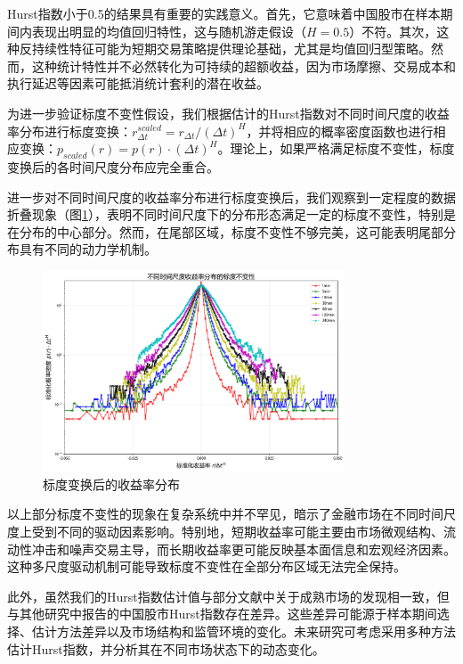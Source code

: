 \documentclass[12pt, a4paper]{article}
\begin{document}
Hurst指数小于0.5的结果具有重要的实践意义。首先，它意味着中国股市在样本期间内表现出明显的均值回归特性，这与随机游走假设（$H = 0.5$）不符。其次，这种反持续性特征可能为短期交易策略提供理论基础，尤其是均值回归型策略。然而，这种统计特性并不必然转化为可持续的超额收益，因为市场摩擦、交易成本和执行延迟等因素可能抵消统计套利的潜在收益。

为进一步验证标度不变性假设，我们根据估计的Hurst指数对不同时间尺度的收益率分布进行标度变换：$r_{\Delta t}^{scaled} = r_{\Delta t}/(\Delta t)^H$，并将相应的概率密度函数也进行相应变换：$p_{scaled}(r) = p(r) \cdot (\Delta t)^H$。理论上，如果严格满足标度不变性，标度变换后的各时间尺度分布应完全重合。

进一步对不同时间尺度的收益率分布进行标度变换后，我们观察到一定程度的数据折叠现象（图\ref{fig:normalized_distributions}），表明不同时间尺度下的分布形态满足一定的标度不变性，特别是在分布的中心部分。然而，在尾部区域，标度不变性不够完美，这可能表明尾部分布具有不同的动力学机制。

\begin{figure}[htbp]
\centering
\includegraphics[width=0.8\textwidth]{../assets/img/不同时间尺度收益率分布的标度不变性.png}
\caption{标度变换后的收益率分布}
\label{fig:normalized_distributions}
\end{figure}

以上部分标度不变性的现象在复杂系统中并不罕见，暗示了金融市场在不同时间尺度上受到不同的驱动因素影响。特别地，短期收益率可能主要由市场微观结构、流动性冲击和噪声交易主导，而长期收益率更可能反映基本面信息和宏观经济因素。这种多尺度驱动机制可能导致标度不变性在全部分布区域无法完全保持。

此外，虽然我们的Hurst指数估计值与部分文献中关于成熟市场的发现相一致，但与其他研究中报告的中国股市Hurst指数存在差异。这些差异可能源于样本期间选择、估计方法差异以及市场结构和监管环境的变化。未来研究可考虑采用多种方法估计Hurst指数，并分析其在不同市场状态下的动态变化。
\end{document}
